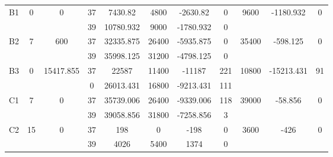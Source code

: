 \begin{sidewaystable}
\begin{tabular}{c||c|c||c|c|c|c|c||c|c|c}
         &
        
      \\
      \hline
      \multirow{2}{*}{B1} &
      \multirow{2}{*}{0} &
      \multirow{2}{*}{0} &
      37 &
      7430.82 &
      4800 &
        -2630.82 &
        0 &
      \multirow{2}{*}{9600} &
        \multirow{2}{*}{-1180.932} &
        \multirow{2}{*}{0}
      \\
      \cline{4-8}
       &
       &
       &
      39 &
      10780.932 &
      9000 &
        -1780.932 &
        0 &
      
         &
        
      \\
      \hline
      \multirow{2}{*}{B2} &
      \multirow{2}{*}{7} &
      \multirow{2}{*}{600} &
      37 &
      32335.875 &
      26400 &
        -5935.875 &
        0 &
      \multirow{2}{*}{35400} &
        \multirow{2}{*}{-598.125} &
        \multirow{2}{*}{0}
      \\
      \cline{4-8}
       &
       &
       &
      39 &
      35998.125 &
      31200 &
        -4798.125 &
        0 &
      
         &
        
      \\
      \hline
      \multirow{2}{*}{B3} &
      \multirow{2}{*}{0} &
      \multirow{2}{*}{15417.855} &
      37 &
      22587 &
      11400 &
        -11187 &
        221 &
      \multirow{2}{*}{10800} &
        \multirow{2}{*}{-15213.431} &
        \multirow{2}{*}{91}
      \\
      \cline{4-8}
       &
       &
       &
      0 &
      26013.431 &
      16800 &
        -9213.431 &
        111 &
      
         &
        
      \\
      \hline
      \multirow{2}{*}{C1} &
      \multirow{2}{*}{7} &
      \multirow{2}{*}{0} &
      37 &
      35739.006 &
      26400 &
        -9339.006 &
        118 &
      \multirow{2}{*}{39000} &
        \multirow{2}{*}{-58.856} &
        \multirow{2}{*}{0}
      \\
      \cline{4-8}
       &
       &
       &
      39 &
      39058.856 &
      31800 &
        -7258.856 &
        3 &
      
         &
        
      \\
      \hline
      \multirow{2}{*}{C2} &
      \multirow{2}{*}{15} &
      \multirow{2}{*}{0} &
      37 &
      198 &
      0 &
        -198 &
        0 &
      \multirow{2}{*}{3600} &
        \multirow{2}{*}{-426} &
        \multirow{2}{*}{0}
      \\
      \cline{4-8}
       &
       &
       &
      39 &
      4026 &
      5400 &
        1374 &
        0 &
      

\end{tabular}
\end{sidewaystable}

